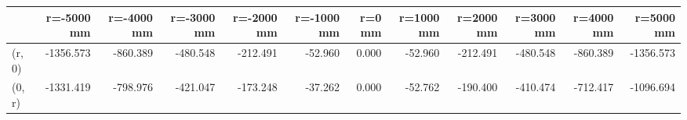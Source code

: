 \documentclass[convert={convertexe={magick.exe}}]{standalone}
\begin{document}
\begin{tabular}{lrrrrrrrrrrr}
\toprule
{} &  r=-5000 mm &  r=-4000 mm &  r=-3000 mm &  r=-2000 mm &  r=-1000 mm &  r=0 mm &  r=1000 mm &  r=2000 mm &  r=3000 mm &  r=4000 mm &  r=5000 mm \\
\midrule
(r, 0) &   -1356.573 &    -860.389 &    -480.548 &    -212.491 &     -52.960 &   0.000 &    -52.960 &   -212.491 &   -480.548 &   -860.389 &  -1356.573 \\
(0, r) &   -1331.419 &    -798.976 &    -421.047 &    -173.248 &     -37.262 &   0.000 &    -52.762 &   -190.400 &   -410.474 &   -712.417 &  -1096.694 \\
\bottomrule
\end{tabular}
\end{document}
